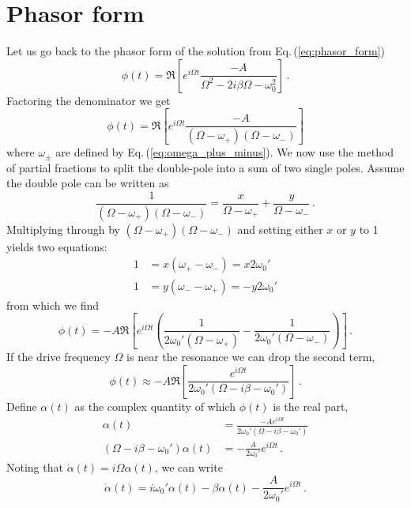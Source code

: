 \documentclass{article}
\begin{document}
\section{Phasor form}

Let us go back to the phasor form of the solution from Eq.\,(\ref{eq:phasor_form})
\begin{equation}
\phi(t) = \Re \left[ e^{i \Omega t} \frac{-A}{\Omega^2 - 2 i \beta \Omega - \omega_0^2} \right] \, .
\end{equation}
Factoring the denominator we get
\begin{equation}
\phi(t) = \Re \left[ e^{i \Omega t} \frac{-A}{(\Omega - \omega_+)(\Omega - \omega_-)} \right]
\end{equation}
where $\omega_{\pm}$ are defined by Eq.\,(\ref{eq:omega_plus_minus}).
We now use the method of partial fractions to split the double-pole into a sum of two single poles.
Assume the double pole can be written as
\begin{equation}
\frac{1}{(\Omega - \omega_+)(\Omega - \omega_-)}
= \frac{x}{\Omega - \omega_+} + \frac{y}{\Omega - \omega_-} \, .
\end{equation}
Multiplying through by $(\Omega - \omega_+)(\Omega - \omega_-)$ and setting either $x$ or $y$ to 1 yields two equations:
\begin{align}
1 &= x (\omega_+ - \omega_-) = x 2 \omega_0' \\
1 &= y (\omega_- - \omega_+) = -y 2 \omega_0'
\end{align}
from which we find
\begin{equation}
\phi(t) = -A \Re
\left[ e^{i \Omega t} \left(
\frac{1}{2 \omega_0' (\Omega - \omega_+)} -
\frac{1}{2 \omega_0' (\Omega - \omega_-)}
\right) \right] \, .
\end{equation}
If the drive frequency $\Omega$ is near the resonance we can drop the second term,
\begin{equation}
\phi(t) \approx -A \Re
\left[
\frac{e^{i \Omega t}}{2 \omega_0' (\Omega - i\beta - \omega_0')}
\right] \, .
\end{equation}
Define $\alpha(t)$ as the complex quantity of which $\phi(t)$ is the real part,
\begin{align}
\alpha(t) &= \frac{-A e^{i \Omega t}}{2 \omega_0'(\Omega - i \beta - \omega_0')} \\
(\Omega - i \beta - \omega_0') \alpha(t) &= - \frac{A}{2\omega_0'} e^{i \Omega t} \, .
\end{align}
Noting that $\dot{\alpha}(t) = i \Omega \alpha(t)$, we can write
\begin{equation}
\dot{\alpha}(t) = i \omega_0' \alpha(t) - \beta \alpha(t) - \frac{A}{2 \omega_0'} e^{i \Omega t} \, .
\end{equation}
\end{document}
